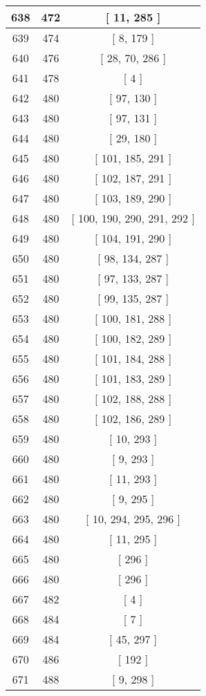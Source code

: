 \begin{center}
\begin{longtable}[H]{|| c c c ||}
\hline
638 & 472 & [ 11, 285 ] \\ 
\hline
639 & 474 & [ 8, 179 ] \\ 
\hline
640 & 476 & [ 28, 70, 286 ] \\ 
\hline
641 & 478 & [ 4 ] \\ 
\hline
642 & 480 & [ 97, 130 ] \\ 
\hline
643 & 480 & [ 97, 131 ] \\ 
\hline
644 & 480 & [ 29, 180 ] \\ 
\hline
645 & 480 & [ 101, 185, 291 ] \\ 
\hline
646 & 480 & [ 102, 187, 291 ] \\ 
\hline
647 & 480 & [ 103, 189, 290 ] \\ 
\hline
648 & 480 & [ 100, 190, 290, 291, 292 ] \\ 
\hline
649 & 480 & [ 104, 191, 290 ] \\ 
\hline
650 & 480 & [ 98, 134, 287 ] \\ 
\hline
651 & 480 & [ 97, 133, 287 ] \\ 
\hline
652 & 480 & [ 99, 135, 287 ] \\ 
\hline
653 & 480 & [ 100, 181, 288 ] \\ 
\hline
654 & 480 & [ 100, 182, 289 ] \\ 
\hline
655 & 480 & [ 101, 184, 288 ] \\ 
\hline
656 & 480 & [ 101, 183, 289 ] \\ 
\hline
657 & 480 & [ 102, 188, 288 ] \\ 
\hline
658 & 480 & [ 102, 186, 289 ] \\ 
\hline
659 & 480 & [ 10, 293 ] \\ 
\hline
660 & 480 & [ 9, 293 ] \\ 
\hline
661 & 480 & [ 11, 293 ] \\ 
\hline
662 & 480 & [ 9, 295 ] \\ 
\hline
663 & 480 & [ 10, 294, 295, 296 ] \\ 
\hline
664 & 480 & [ 11, 295 ] \\ 
\hline
665 & 480 & [ 296 ] \\ 
\hline
666 & 480 & [ 296 ] \\ 
\hline
667 & 482 & [ 4 ] \\ 
\hline
668 & 484 & [ 7 ] \\ 
\hline
669 & 484 & [ 45, 297 ] \\ 
\hline
670 & 486 & [ 192 ] \\ 
\hline
671 & 488 & [ 9, 298 ] \\ 

\end{longtable}
\end{center}
